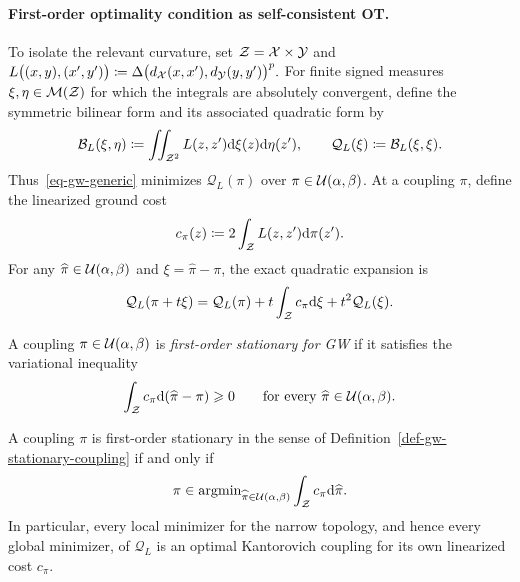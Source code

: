 \paragraph{First-order optimality condition as self-consistent OT.}
To isolate the relevant curvature, set $\mathcal Z=\mathcal{X}\times\mathcal{Y}$ and
\(L\bigl((x,y),(x',y')\bigr) \coloneqq \Delta\bigl(d_{\mathcal{X}}(x,x'),d_{\mathcal{Y}}(y,y')\bigr)^p.\)
For finite signed measures $\xi,\eta\in\mathcal{M}(\mathcal Z)$ for which the integrals are absolutely convergent, define the symmetric bilinear form and its associated quadratic form by
\begin{equation}\label{eq-gw-quadratic-form}
\mathcal B_L(\xi,\eta)
\coloneqq
\iint_{\mathcal Z^2}L(z,z')\mathrm{d}\xi(z)\mathrm{d}\eta(z'),
\qquad
\mathcal Q_L(\xi)
\coloneqq\mathcal B_L(\xi,\xi).
\end{equation}
Thus~\eqref{eq-gw-generic} minimizes $\mathcal Q_L(\pi)$ over $\pi\in\mathcal{U}(\alpha,\beta)$. At a coupling $\pi$, define the linearized ground cost
\begin{equation}\label{eq-gw-linearized-cost}
c_\pi(z)
\coloneqq
2\int_{\mathcal Z}L(z,z')\mathrm{d}\pi(z').
\end{equation}
For any $\widehat\pi\in\mathcal{U}(\alpha,\beta)$ and $\xi=\widehat\pi-\pi$, the exact quadratic expansion is
\begin{equation}\label{eq-gw-exact-linearization}
\mathcal Q_L(\pi+t\xi)
=
\mathcal Q_L(\pi)
{}+t\int_{\mathcal Z}c_\pi\mathrm{d}\xi
{}+t^2\mathcal Q_L(\xi).
\end{equation}
\begin{defn}\label{def-gw-stationary-coupling}
A coupling $\pi\in\mathcal{U}(\alpha,\beta)$ is \emph{first-order stationary for GW} if it satisfies the variational inequality
\begin{equation}\label{eq-gw-stationary-variational-inequality}
\int_{\mathcal Z}c_\pi\mathrm{d}(\widehat\pi-\pi)\geqslant0
\qquad\text{for every }\widehat\pi\in\mathcal{U}(\alpha,\beta).
\end{equation}
\end{defn}
\begin{prop}\label{prop-gw-frozen-ot-stationarity}
A coupling $\pi$ is first-order stationary in the sense of Definition~\ref{def-gw-stationary-coupling} if and only if
\begin{equation}\label{eq-gw-frozen-ot-fixed-point}
\pi\in\operatorname{argmin}_{\widehat\pi\in\mathcal{U}(\alpha,\beta)}
\int_{\mathcal Z}c_\pi\mathrm{d}\widehat\pi.
\end{equation}
In particular, every local minimizer for the narrow topology, and hence every global minimizer, of $\mathcal Q_L$ is an optimal Kantorovich coupling for its own linearized cost $c_\pi$.
\end{prop}
